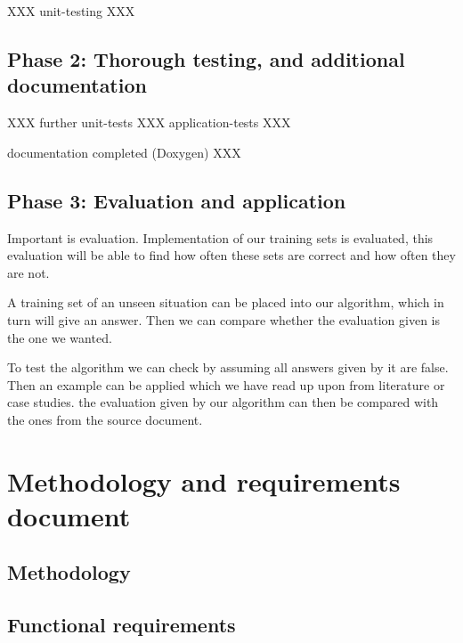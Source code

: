 \documentclass{article}
\begin{document}
XXX unit-testing XXX


\subsection{Phase 2: Thorough testing, and additional documentation}
\label{sec:phase2}

XXX further unit-tests XXX application-tests XXX

documentation completed (Doxygen) XXX


\subsection{Phase 3: Evaluation and application}
\label{sec:phase3}

Important is evaluation. Implementation of our training sets is evaluated, this evaluation will be able to find how often these sets are correct and how often they are not.

A training set of an unseen situation can be placed into our algorithm, which in turn will give an answer. Then we can compare whether the evaluation given is the one we wanted.

To test the algorithm we can check by assuming all answers given by it are false. Then an example can be applied which we have read up upon from literature or case studies. the evaluation given by our algorithm can then be compared with the ones from the source document.



\section{Methodology and requirements document}
\label{sec:methrecdoc}

\subsection{Methodology}
\label{sec:meth}


\subsection{Functional requirements}
\end{document}
